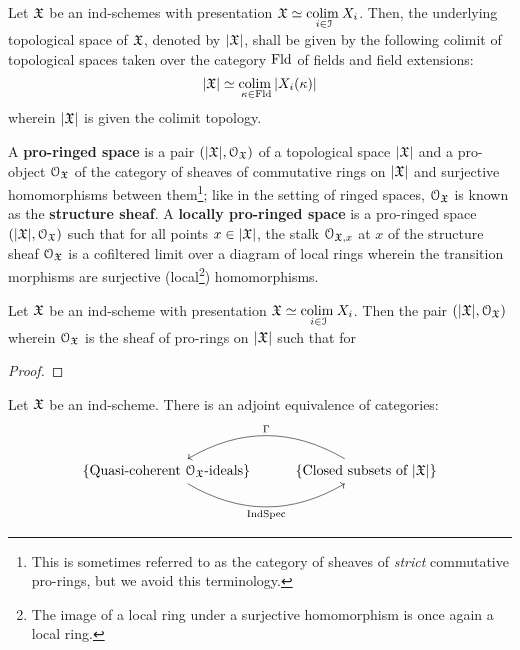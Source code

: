             \begin{definition} \label{def: underlying_topological_spaces_of_ind_schemes}
                Let $\mathfrak{X}$ be an ind-schemes with presentation $\mathfrak{X} \simeq \underset{i \in \mathcal{I}}{\operatorname{colim} \:} X_i$. Then, the underlying topological space of $\mathfrak{X}$, denoted by $|\mathfrak{X}|$, shall be given by the following colimit of topological spaces taken over the category $\mathrm{Fld}$ of fields and field extensions:
                    $$|\mathfrak{X}| \simeq \underset{\kappa \in \mathrm{Fld}}{\operatorname{colim} \:} |X_i(\kappa)|$$
                wherein $|\mathfrak{X}|$ is given the colimit topology.
            \end{definition}
            \begin{definition} \label{def: pro_ringed_spaces}
                A \textbf{pro-ringed space} is a pair $(|\mathfrak{X}|, \mathcal{O}_{\mathfrak{X}})$ of a topological space $|\mathfrak{X}|$ and a pro-object $\mathcal{O}_{\mathfrak{X}}$ of the category of sheaves of commutative rings on $|\mathfrak{X}|$ and surjective homomorphisms between them\footnote{This is sometimes referred to as the category of sheaves of \textit{strict} commutative pro-rings, but we avoid this terminology.}; like in the setting of ringed spaces, $\mathcal{O}_{\mathfrak{X}}$ is known as the \textbf{structure sheaf}. A \textbf{locally pro-ringed space} is a pro-ringed space $(|\mathfrak{X}|, \mathcal{O}_{\mathfrak{X}})$ such that for all points $x \in |\mathfrak{X}|$, the stalk $\mathcal{O}_{\mathfrak{X}, x}$ at $x$ of the structure sheaf $\mathcal{O}_{\mathfrak{X}}$ is a cofiltered limit over a diagram of local rings wherein the transition morphisms are surjective (local\footnote{The image of a local ring under a surjective homomorphism is once again a local ring.}) homomorphisms.  
            \end{definition}
            \begin{lemma} \label{lemma: ind_schemes_are_locally_pro_ringed_spaces}
                Let $\mathfrak{X}$ be an ind-scheme with presentation $\mathfrak{X} \simeq \underset{i \in \mathcal{I}}{\operatorname{colim} \:} X_i$. Then the pair $(|\mathfrak{X}|, \mathcal{O}_{\mathfrak{X}})$ wherein $\mathcal{O}_{\mathfrak{X}}$ is the sheaf of pro-rings on $|\mathfrak{X}|$ such that for 
            \end{lemma}
                \begin{proof}
                    
                \end{proof}
            \begin{proposition} \label{prop: nullstellensatz_for_ind_schemes}
                Let $\mathfrak{X}$ be an ind-scheme. There is an adjoint equivalence of categories:
                    $$
                        \begin{tikzcd}
                        	{\left\{\text{Quasi-coherent $\calO_{\frakX}$-ideals}\right\}} & {\left\{\text{Closed subsets of $|\frakX|$}\right\}}
                        	\arrow["{\Ind\Spec }"', bend right, from=1-1, to=1-2]
                        	\arrow["\Gamma"', bend right, from=1-2, to=1-1]
                        \end{tikzcd}
                    $$
            \end{proposition}

